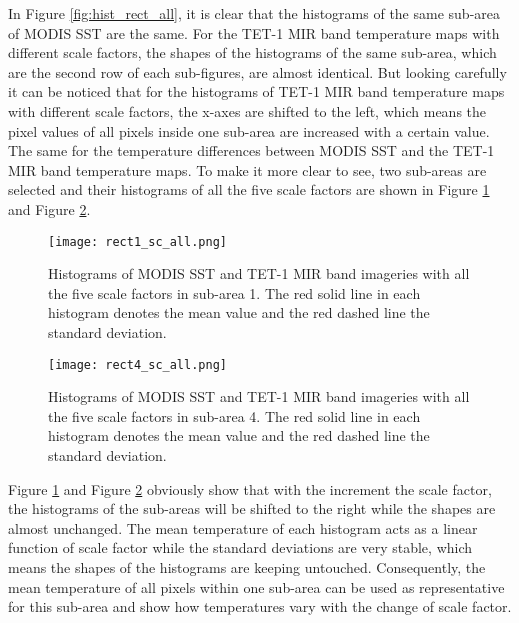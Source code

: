 \noindent In Figure \ref{fig:hist_rect_all}, it is clear that the histograms of the same sub-area of MODIS SST are the same. For the TET-1 MIR band temperature maps with different scale factors, the shapes of the histograms of the same sub-area, which are the second row of each sub-figures, are almost identical. But looking carefully it can be noticed that for the histograms of TET-1 MIR band temperature maps with different scale factors, the x-axes are shifted to the left, which means the pixel values of all pixels inside one sub-area are increased with a certain value. The same for the temperature differences between MODIS SST and the TET-1 MIR band temperature maps. To make it more clear to see, two sub-areas are selected and their histograms of all the five scale factors are shown in Figure \ref{fig:rect1_sc_all} and Figure \ref{fig:rect4_sc_all}.\\

\begin{figure}[!htbp]
\centering
\texttt{[image: rect1\_sc\_all.png]}
\caption{Histograms of MODIS SST and TET-1 MIR band imageries with all the five scale factors in sub-area 1. The red solid line in each histogram denotes the mean value and the red dashed line the standard deviation.}
\label{fig:rect1_sc_all}
\end{figure}

\begin{figure}[!htbp]
\centering
\texttt{[image: rect4\_sc\_all.png]}
\caption{Histograms of MODIS SST and TET-1 MIR band imageries with all the five scale factors in sub-area 4. The red solid line in each histogram denotes the mean value and the red dashed line the standard deviation.}
\label{fig:rect4_sc_all}
\end{figure}

\noindent Figure \ref{fig:rect1_sc_all} and Figure \ref{fig:rect4_sc_all} obviously show that with the increment the scale factor, the histograms of the sub-areas will be shifted to the right while the shapes are almost unchanged. The mean temperature of each histogram acts as a linear function of scale factor while the standard deviations are very stable, which means the shapes of the histograms are keeping untouched. Consequently, the mean temperature of all pixels within one sub-area can be used as representative for this sub-area and show how temperatures vary with the change of scale factor.\\

